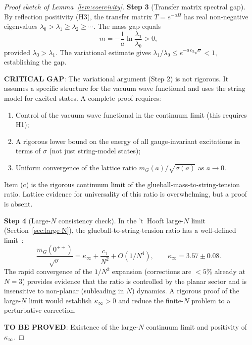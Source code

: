 \documentclass[11pt]{article}
\begin{document}
\begin{proof}[Proof sketch of Lemma~\ref{lem:coercivity}]
\textbf{Step 3} (Transfer matrix spectral gap).  By reflection
positivity (H3), the transfer matrix $T = e^{-aH}$ has real
non-negative eigenvalues $\lambda_0 > \lambda_1 \geq \lambda_2
\geq \cdots$.  The mass gap equals
\begin{equation}\label{eq:transfer-gap}
  m = -\frac{1}{a}\ln\frac{\lambda_1}{\lambda_0} > 0,
\end{equation}
provided $\lambda_0 > \lambda_1$.  The variational estimate gives
$\lambda_1/\lambda_0 \leq e^{-a\,c_3\sqrt{\sigma}} < 1$, establishing
the gap.

\textbf{CRITICAL GAP}: The variational argument (Step 2) is not
rigorous.  It assumes a specific structure for the vacuum wave
functional and uses the string model for excited states.  A complete
proof requires:
\begin{enumerate}
  \item[(a)] Control of the vacuum wave functional in the continuum
    limit (this requires H1);
  \item[(b)] A rigorous lower bound on the energy of all
    gauge-invariant excitations in terms of $\sigma$ (not just
    string-model states);
  \item[(c)] Uniform convergence of the lattice ratio
    $m_G(a)/\sqrt{\sigma(a)}$ as $a \to 0$.
\end{enumerate}
Item (c) is the rigorous continuum limit of the glueball-mass-to-string-tension
ratio.  Lattice evidence for universality of this ratio is
overwhelming, but a proof is absent.

\textbf{Step 4} (Large-$N$ consistency check).  In the 't~Hooft large-$N$
limit (Section~\ref{sec:large-N}), the glueball-to-string-tension ratio
has a well-defined limit~\cite{LTW}:
\begin{equation}\label{eq:large-N-ratio}
  \frac{m_G(0^{++})}{\sqrt{\sigma}}
  = \kappa_\infty + \frac{c_1}{N^2} + O(1/N^4),
  \qquad \kappa_\infty = 3.57 \pm 0.08.
\end{equation}
The rapid convergence of the $1/N^2$ expansion (corrections are $<5\%$
already at $N = 3$) provides evidence that the ratio is controlled by
the planar sector and is insensitive to non-planar (subleading in $N$)
dynamics.  A rigorous proof of the large-$N$ limit would establish
$\kappa_\infty > 0$ and reduce the finite-$N$ problem to a perturbative
correction.

\textbf{TO BE PROVED}: Existence of the large-$N$ continuum limit and
positivity of $\kappa_\infty$.


\end{proof}
\end{document}
